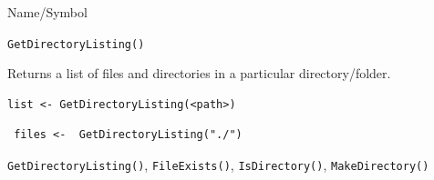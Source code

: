 \begin{desc}{Name/Symbol}
\item[Name/Symbol]	\verb+GetDirectoryListing()+

\item[Description]	Returns a list of files and directories in a particular directory/folder.
\item[Usage]		
\begin{verbatim}
list <- GetDirectoryListing(<path>)
\end{verbatim}

\item[Example]	
\begin{verbatim}
 files <-  GetDirectoryListing("./")
\end{verbatim}

\item[See Also]\verb+GetDirectoryListing()+, \verb+FileExists()+,       \verb+IsDirectory()+,        
   \verb+MakeDirectory()+      

\end{desc}


